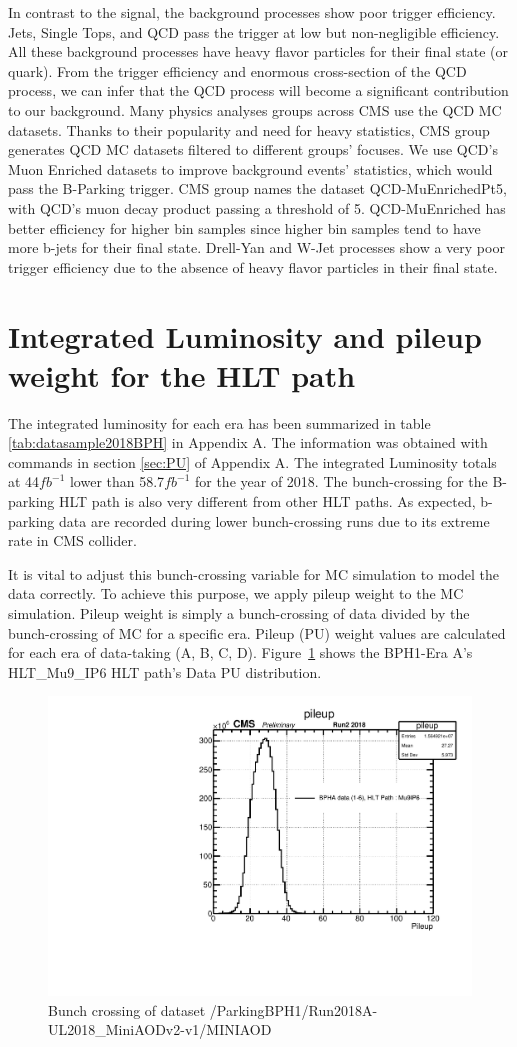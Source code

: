 In contrast to the signal, the background processes show poor trigger efficiency.
\ttbar Jets, Single Tops, and QCD pass the trigger at low but non-negligible efficiency.
All these background processes have heavy flavor particles for their final state (\PQb or \PQt quark).
From the trigger efficiency and enormous cross-section of the QCD process, we can infer that the QCD process will become a significant contribution to our background.
Many physics analyses groups across CMS use the QCD MC datasets.
Thanks to their popularity and need for heavy statistics, CMS group generates QCD MC datasets filtered to different groups' focuses.
We use QCD's Muon Enriched datasets to improve background events' statistics, which would pass the B-Parking trigger.
CMS group names the dataset QCD-MuEnrichedPt5, with QCD's muon decay product passing a \pt threshold of 5\GeV.
QCD-MuEnriched has better efficiency for higher \pt bin samples since higher \pt bin samples tend to have more b-jets for their final state.
Drell-Yan and W-Jet processes show a very poor trigger efficiency due to the absence of heavy flavor particles in their final state.


\section{Integrated Luminosity and pileup weight for the HLT path}
The integrated luminosity for each era has been summarized in table \ref{tab:datasample2018BPH} in Appendix A.
The information was obtained with commands in section \ref{sec:PU} of Appendix A.
The integrated Luminosity totals at 44$fb^{-1}$ lower than 58.7$fb^{-1}$ for the year of 2018.
The bunch-crossing for the B-parking HLT path is also very different from other HLT paths.
As expected, b-parking data are recorded during lower bunch-crossing runs due to its extreme rate in CMS collider.

It is vital to adjust this bunch-crossing variable for MC simulation to model the data correctly.
To achieve this purpose, we apply pileup weight to the MC simulation.
Pileup weight is simply a bunch-crossing of data divided by the bunch-crossing of MC for a specific era.
Pileup (PU) weight values are calculated for each era of data-taking (A, B, C, D).
Figure~\ref{fig:EraAData} shows the BPH1-Era A's HLT\_Mu9\_IP6 HLT path's Data PU distribution.
\begin{figure}[h!]
  \caption{Bunch crossing of dataset /ParkingBPH1/Run2018A-UL2018\_MiniAODv2-v1/MINIAOD}
  \label{fig:EraAData}
  \centering
  \includegraphics[width=0.67\linewidth]{figs/NVtx_BPHA.pdf}

\end{figure}


